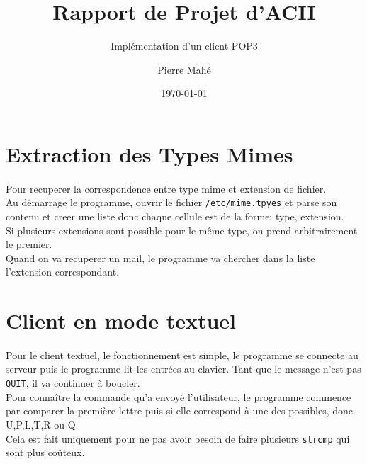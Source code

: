 \documentclass[a4paper, titlepage, oneside, 12pt]{article}%
\title{Rapport de Projet d'ACII}
\subtitle{Implémentation d'un client POP3}
\author{Pierre Mahé}
\date{\today}
\begin{document}
 
\maketitle 

\newpage

\section{Extraction des Types Mimes}
\paragraph{}
Pour recuperer la correspondence entre type mime et extension de fichier.\\
Au démarrage le programme, ouvrir le fichier \texttt{/etc/mime.tpyes} et parse son contenu et creer une liste donc chaque cellule est de la forme: type, extension.\\
Si plusieurs extensions sont possible pour le même type, on prend arbitrairement le premier.\\
Quand on va recuperer un mail, le programme va chercher dans la liste l'extension correspondant.

\section{Client en mode textuel}
\paragraph{}
Pour le client textuel, le fonctionnement est simple, le programme se connecte au serveur puis le programme lit les entrées au clavier.
Tant que le message n'est pas \texttt{QUIT}, il va continuer à boucler.\\
Pour connaître la commande qu'a envoyé l'utilisateur, le programme commence par comparer la première lettre puis si elle correspond à une des possibles, donc U,P,L,T,R ou Q.\\
Cela est fait uniquement pour ne pas avoir besoin de faire plusieurs \texttt{strcmp} qui sont plus coûteux.
\end{document}
